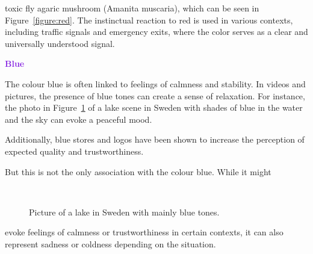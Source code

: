 \documentclass[../MasterThesis.tex]{subfiles}
\begin{document}
\vspace*{-0.6em}
toxic fly agaric mushroom (Amanita muscaria), which can be seen in Figure~\ref{figure:red}.
The instinctual reaction to red is used in various contexts, including traffic signals and emergency exits, where the color serves as a clear and universally understood signal.







\newpage
\textbf{\textcolor{BlueViolet}{Blue}}

%
\begin{minipage}{0.45\textwidth}
	The colour blue is often linked to feelings of calmness and stability. In videos and pictures, the presence of blue tones can create a sense of relaxation. For instance, the photo in Figure~\ref{figure:blue} of a lake scene in Sweden with shades of blue in the water and the sky can evoke a peaceful mood.
	
	Additionally, blue stores and logos have been shown to increase the perception of expected quality and trustworthiness.~\cite{blue_trust, colour2}
	
	But this is not the only association with the colour blue. While it might
	
	
	
\end{minipage}\begin{minipage}{0.05\textwidth}
	\ 
\end{minipage}\begin{minipage}{0.5\textwidth}
	\begin{figure}[H]
		\begin{center}
			\caption[Picture of a lake in Sweden with mainly blue tones.]{Picture of a lake in Sweden with mainly blue tones.}
			\label{figure:blue}
		\end{center}
	\end{figure}\hfill
\end{minipage}

\vspace*{-0.6em}
evoke feelings of calmness or trustworthiness in certain contexts, it can also represent sadness or coldness depending on the situation.~\cite{colour2}
\end{document}
